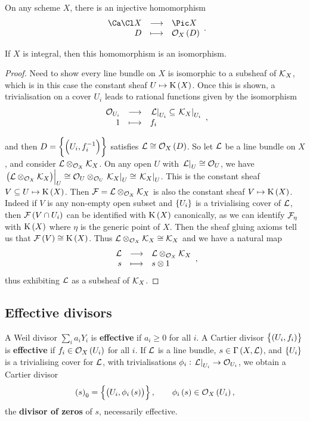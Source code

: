 \begin{corollary}
On any scheme $ X $, there is an injective homomorphism
$$ \function{\Ca\Cl X}{\Pic X}{D}{\OOO_X\br{D}}. $$
\end{corollary}

\begin{proposition}
If $ X $ is integral, then this homomorphism is an isomorphism.
\end{proposition}

\begin{proof}
Need to show every line bundle on $ X $ is isomorphic to a subsheaf of $ \mathcal{K}_X $, which is in this case the constant sheaf $ U \mapsto \K\br{X} $. Once this is shown, a trivialisation on a cover $ U_i $ leads to rational functions given by the isomorphism
$$ \function{\OOO_{U_i}}{\eval{\LLL}_{U_i} \subseteq \eval{\KKK_X}_{U_i}}{1}{f_i}, $$

\pagebreak

and then $ D = \cbr{\br{U_i, f_i^{-1}}} $ satisfies $ \LLL \cong \OOO_X\br{D} $. So let $ \mathcal{L} $ be a line bundle on $ X $, and consider $ \mathcal{L} \otimes_{\mathcal{O}_X} \mathcal{K}_X $. On any open $ U $ with $ \left. \mathcal{L} \right|_U \cong \mathcal{O}_U $, we have $ \eval{\br{\LLL \otimes_{\OOO_X} \KKK_X}}_U \cong \OOO_U \otimes_{\OOO_U} \eval{\KKK_X}_U \cong \eval{\KKK_X}_U $. This is the constant sheaf $ V \subseteq U \mapsto \K\br{X} $. Then $ \mathcal{F} = \mathcal{L} \otimes_{\mathcal{O}_X} \mathcal{K}_X $ is also the constant sheaf $ V \mapsto \K\br{X} $. Indeed if $ V $ is any non-empty open subset and $ \cbr{U_i} $ is a trivialising cover of $ \mathcal{L} $, then $ \FFF\br{V \cap U_i} $ can be identified with $ \K\br{X} $ canonically, as we can identify $ \mathcal{F}_\eta $ with $ \K\br{X} $ where $ \eta $ is the generic point of $ X $. Then the sheaf gluing axioms tell us that $ \FFF\br{V} \cong \K\br{X} $. Thus $ \mathcal{L} \otimes_{\mathcal{O}_X} \mathcal{K}_X \cong \mathcal{K}_X $ and we have a natural map
$$ \function{\LLL}{\LLL \otimes_{\OOO_X} \KKK_X}{s}{s \otimes 1}, $$
thus exhibiting $ \mathcal{L} $ as a subsheaf of $ \mathcal{K}_X $.
\end{proof}

\subsection{Effective divisors}

\begin{definition*}
A Weil divisor $ \sum_i a_iY_i $ is \textbf{effective} if $ a_i \ge 0 $ for all $ i $. A Cartier divisor $ \cbr{\br{U_i, f_i}} $ is \textbf{effective} if $ f_i \in \OOO_X\br{U_i} $ for all $ i $. If $ \mathcal{L} $ is a line bundle, $ s \in \Gamma\br{X, \LLL} $, and $ \cbr{U_i} $ is a trivialising cover for $ \mathcal{L} $, with trivialisations $ \phi_i : \left. \mathcal{L} \right|_{U_i} \to \mathcal{O}_{U_i} $, we obtain a Cartier divisor
$$ \br{s}_0 = \cbr{\br{U_i, \phi_i\br{s}}}, \qquad \phi_i\br{s} \in \OOO_X\br{U_i}, $$
the \textbf{divisor of zeros} of $ s $, necessarily effective.
\end{definition*}

